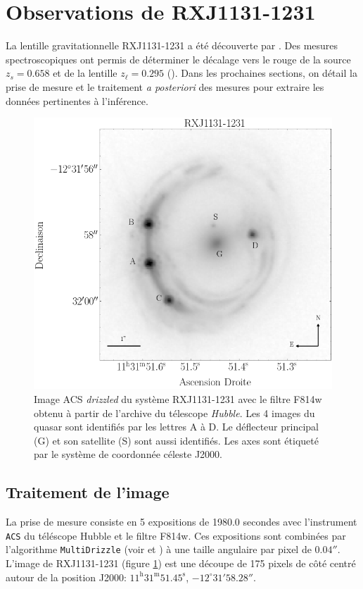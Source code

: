 \documentclass[times,10pt,twocolumn]{article}
\begin{document}
\section{Observations de RXJ1131-1231}\label{sec:observation}
La lentille gravitationnelle RXJ1131-1231 a été découverte par 
\citet{Sluse2003}. Des mesures spectroscopiques ont permis de déterminer le 
décalage vers le rouge de la source $z_s = 0.658$ et de la lentille 
$z_\ell = 0.295$ (\citet{Sluse2003}). Dans les prochaines sections, on détail 
la prise de mesure et le traitement \textit{a posteriori} des mesures pour 
extraire les données pertinentes à l'inférence.
\begin{figure}[H]
        \centering
        \includegraphics[width=\linewidth]{good_cutout}
        \caption{Image ACS \textit{drizzled} du système RXJ1131-1231 avec le filtre F814w obtenu 
                à partir de l'archive du télescope \textit{Hubble}. Les 
        4 images du quasar sont identifiés par les lettres A à D. Le déflecteur principal (G) 
        et son satellite (S) sont aussi identifiés. Les axes sont étiqueté par le système 
        de coordonnée céleste J2000.}
        \label{fig:rxj1131}
\end{figure}

\subsection{Traitement de l'image}
La prise de mesure consiste en 5 expositions de 1980.0 secondes avec 
l'instrument \texttt{ACS} du téléscope Hubble et le filtre F814w. Ces 
expositions sont combinées par l'algorithme \texttt{MultiDrizzle} 
(voir \citet{Massey2010} et \citet{Koekemoer2007}) à une taille angulaire 
par pixel de $0.04''$. L'image de RXJ1131-1231 (figure \ref{fig:rxj1131}) 
est une découpe de 175 pixels de côté centré autour de la position 
J2000: $11^{\mathrm{h}}31^{\mathrm{m}}51.45^{\mathrm{s}}$, $-12^{\circ}31'58.28''$.
\end{document}

